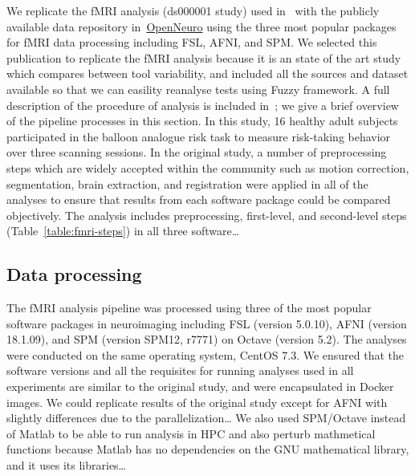 \documentclass[conference]{IEEEtran}
\begin{document}
We replicate the fMRI analysis (ds000001 study) used in~\cite{bowring2019exploring} with the publicly available
data repository in~\href{https://openneuro.org/datasets/ds000001}{OpenNeuro}
using the three most popular packages for fMRI data processing including FSL, AFNI, and SPM. 
We selected this publication to replicate the fMRI analysis because it is an state of the art study
which compares between tool variability, and included all the sources and dataset available
so that we can easility reanalyse tests using Fuzzy framework.
A full description of the procedure of analysis is included in~\cite{bowring2019exploring,schonberg2012decreasing};
we give a brief overview of the pipeline processes in this section.
In this study, 16 healthy adult subjects participated in the balloon analogue risk task to measure risk-taking behavior
over three scanning sessions.
In the original study, a number of preprocessing steps which are widely accepted within the community
such as motion correction, segmentation, brain extraction, and registration 
were applied in all of the analyses to ensure that results from each software package could be compared objectively.
The analysis includes preprocessing, first-level, and second-level steps (Table~\ref{table:fmri-steps}) in all three software\dots


\subsection{Data processing}

The fMRI analysis pipeline was processed using three of the most popular software packages in neuroimaging
including FSL (version 5.0.10), AFNI (version 18.1.09), and SPM (version SPM12, r7771) on Octave (version 5.2).
The analyses were conducted on the same operating system, CentOS 7.3.
We ensured that the software versions and all the requisites for running analyses used in all experiments 
are similar to the original study, and were encapsulated in Docker images.
We could replicate results of the original study except for AFNI with slightly differences due to the parallelization\dots
We also used SPM/Octave instead of Matlab to be able to run analysis in HPC and also perturb mathmetical functions
because Matlab has no dependencies on the GNU mathematical library, and it uses its libraries\dots
\end{document}
